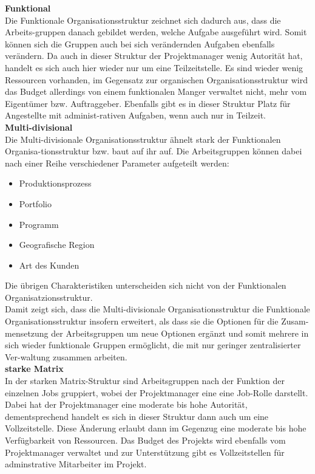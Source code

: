 \documentclass[ThesisDJ.tex]{subfiles}
\begin{document}
\textbf{Funktional}\\
Die Funktionale Organisationsstruktur zeichnet sich dadurch aus, dass die Arbeits-gruppen danach gebildet werden, welche Aufgabe ausgeführt wird. Somit können sich die Gruppen auch bei sich verändernden Aufgaben ebenfalls verändern. Da auch in dieser Struktur der Projektmanager wenig Autorität hat, handelt es sich auch hier wieder nur um eine Teilzeitstelle. Es sind wieder wenig Ressourcen vorhanden, im Gegensatz zur organischen Organisationsstruktur wird das Budget allerdings von einem funktionalen Manger verwaltet nicht, mehr vom Eigentümer bzw. Auftraggeber. Ebenfalls gibt es in dieser Struktur Platz für Angestellte mit administ-rativen Aufgaben, wenn auch nur in Teilzeit. \medskip\\

\textbf{Multi-divisional}\\
Die Multi-divisionale Organisationsstruktur ähnelt stark der Funktionalen Organisa-tionsstruktur bzw. baut auf ihr auf. Die Arbeitsgruppen können dabei nach einer Reihe verschiedener Parameter aufgeteilt werden:\\
\begin{itemize}
\item Produktionsprozess
\item Portfolio
\item Programm
\item Geografische Region
\item Art des Kunden
\end{itemize}
Die übrigen Charakteristiken unterscheiden sich nicht von der Funktionalen Organisatzionsstruktur.\\
Damit zeigt sich, dass die Multi-divisionale Organisationsstruktur die Funktionale Organisationsstruktur insofern erweitert, als dass sie die Optionen für die Zusam-mensetzung der Arbeitsgruppen um neue Optionen ergänzt und somit mehrere in sich wieder funktionale Gruppen ermöglicht, die mit nur geringer zentralisierter Ver-waltung zusammen arbeiten. \medskip\\

\textbf{starke Matrix}\\
In der starken Matrix-Struktur sind Arbeitsgruppen nach der Funktion der einzelnen Jobs gruppiert, wobei der Projektmanager eine eine Job-Rolle darstellt. Dabei hat der Projektmanager eine moderate bis hohe Autorität, dementsprechend handelt es sich in dieser Struktur dann auch um eine Vollzeitstelle. Diese Änderung erlaubt dann im Gegenzug eine moderate bis hohe Verfügbarkeit von Ressourcen. Das Budget des Projekts wird ebenfalls vom Projektmanager verwaltet und zur Unterstützung gibt es Vollzeitstellen für adminstrative Mitarbeiter im Projekt.\medskip\\
\end{document}
